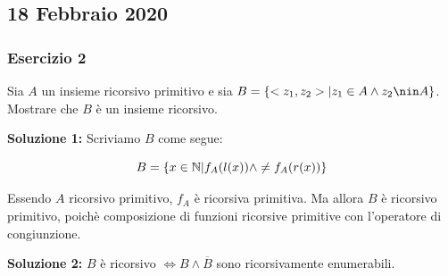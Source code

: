\newpage

\subsection{18 Febbraio 2020}

\subsubsection{Esercizio 2}

Sia \(A\) un insieme ricorsivo primitivo e sia \(B=\cbrakets{<z_1,z_2> \vert z_1 \in A \land z_2 \nin A}\). Mostrare che \(B\) è un insieme ricorsivo.

\textbf{Soluzione 1: } Scriviamo \(B\) come segue:

\begin{equation}
  B=\displaystyle{\left\{{x \in \mathbb{N}\vert f_A(l(x)) \land \neq f_A(r(x))}\right\}}
\end{equation}

Essendo \(A\) ricorsivo primitivo, \(f_A\) è ricorsiva primitiva. Ma allora \(B\) è ricorsivo primitivo, poichè composizione di funzioni ricorsive primitive con l'operatore di congiunzione.

\textbf{Soluzione 2: } \(B\) è ricorsivo \(\iff B \land \overline{B}\) sono ricorsivamente enumerabili.

